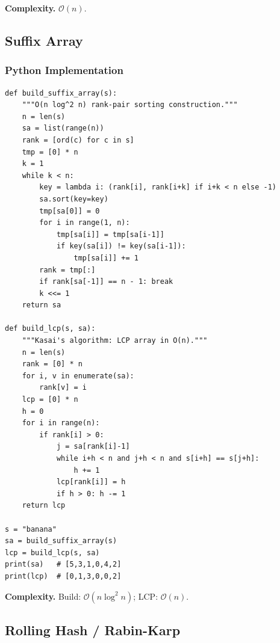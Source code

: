 \documentclass[10pt,a4paper]{article}
\theoremstyle{cpstyle}
\newcommand{\bigO}[1]{\mathcal{O}\!\left(#1\right)}
\begin{document}
\textbf{Complexity.} $\bigO{n}$.

\subsection{Suffix Array}

\subsubsection{Python Implementation}
\begin{lstlisting}[caption={Suffix Array -- $O(n \log^2 n)$ construction}]
def build_suffix_array(s):
    """O(n log^2 n) rank-pair sorting construction."""
    n = len(s)
    sa = list(range(n))
    rank = [ord(c) for c in s]
    tmp = [0] * n
    k = 1
    while k < n:
        key = lambda i: (rank[i], rank[i+k] if i+k < n else -1)
        sa.sort(key=key)
        tmp[sa[0]] = 0
        for i in range(1, n):
            tmp[sa[i]] = tmp[sa[i-1]]
            if key(sa[i]) != key(sa[i-1]):
                tmp[sa[i]] += 1
        rank = tmp[:]
        if rank[sa[-1]] == n - 1: break
        k <<= 1
    return sa

def build_lcp(s, sa):
    """Kasai's algorithm: LCP array in O(n)."""
    n = len(s)
    rank = [0] * n
    for i, v in enumerate(sa):
        rank[v] = i
    lcp = [0] * n
    h = 0
    for i in range(n):
        if rank[i] > 0:
            j = sa[rank[i]-1]
            while i+h < n and j+h < n and s[i+h] == s[j+h]:
                h += 1
            lcp[rank[i]] = h
            if h > 0: h -= 1
    return lcp

s = "banana"
sa = build_suffix_array(s)
lcp = build_lcp(s, sa)
print(sa)   # [5,3,1,0,4,2]
print(lcp)  # [0,1,3,0,0,2]
\end{lstlisting}

\textbf{Complexity.} Build: $\bigO{n \log^2 n}$; LCP: $\bigO{n}$.

\subsection{Rolling Hash / Rabin-Karp}
\end{document}
